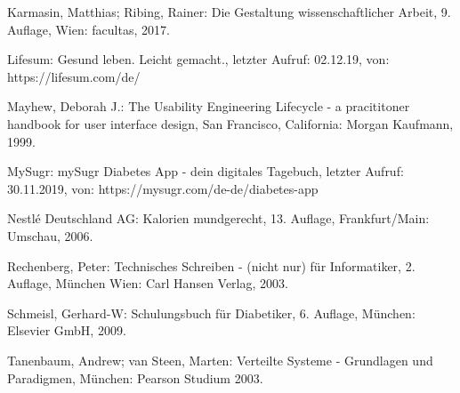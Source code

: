 \begin{thebibliography}{1}
		Karmasin, Matthias; Ribing, Rainer: 
		Die Gestaltung wissenschaftlicher Arbeit, 9. Auflage,
		Wien: facultas,
		2017.
		
		Lifesum: Gesund leben. Leicht gemacht., letzter Aufruf: 02.12.19, von: \newline https://lifesum.com/de/
		
		
		Mayhew, Deborah J.: 
		The Usability Engineering Lifecycle - a pracititoner handbook for user interface design,
		San Francisco, California: Morgan Kaufmann,
		1999.
		
		MySugr:
		mySugr Diabetes App - dein digitales Tagebuch, letzter Aufruf: 30.11.2019, von:	
		https://mysugr.com/de-de/diabetes-app
		
		Nestlé Deutschland AG: 
		Kalorien mundgerecht, 13. Auflage, Frankfurt/Main: Umschau,
		2006.
		
		Rechenberg, Peter: 
		Technisches Schreiben - (nicht nur) für Informatiker, 2. Auflage,
		München Wien: Carl Hansen Verlag,
		2003.
		
		Schmeisl, Gerhard-W: 
		Schulungsbuch für Diabetiker, 6. Auflage, 
		München: Elsevier GmbH,
		2009.
		
		Tanenbaum, Andrew; van Steen, Marten: 
		Verteilte Systeme - Grundlagen und Paradigmen,
		München: Pearson Studium
		2003.
		
	\end{thebibliography}
